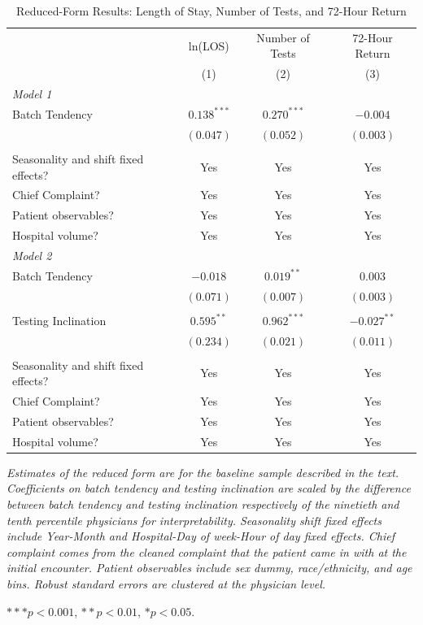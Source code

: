 \documentclass[,,nonblindrev]{informs}
\begin{document}
\begin{table}[htbp]
\centering
\caption{Reduced-Form Results: Length of Stay, Number of Tests, and 72-Hour Return}
\label{tab:reducedform}
\begin{tabular}{p{6.5cm}ccc}
\toprule
& \multicolumn{1}{c}{ln(LOS)}
& \multicolumn{1}{c}{Number of Tests}
& \multicolumn{1}{c}{72-Hour Return} \\
& \multicolumn{1}{c}{(1)}
& \multicolumn{1}{c}{(2)}
& \multicolumn{1}{c}{(3)} \\
\midrule
\textit{Model 1} & & & \\
Batch Tendency      & $0.138^{***}$ & $0.270^{***}$ & $-0.004$  \\
                    & $(0.047)$  & $(0.052)$     & $(0.003)$ \\
\\
Seasonality and shift fixed effects? & Yes & Yes & Yes \\
Chief Complaint? & Yes & Yes & Yes \\
Patient observables? & Yes & Yes & Yes \\
Hospital volume? & Yes & Yes & Yes \\
\midrule
\midrule
\textit{Model 2} & & & \\
Batch Tendency      & $-0.018$      & $0.019^{**}$ & $0.003$   \\
                    & $(0.071)$     & $(0.007)$     & $(0.003)$ \\
                    &     &     &  \\
Testing Inclination    & $0.595^{**}$  & $0.962^{***}$ & $-0.027^{**}$ \\
                    & $(0.234)$  & $(0.021)$     & $(0.011)$ \\
\\
Seasonality and shift fixed effects? & Yes & Yes & Yes \\
Chief Complaint? & Yes & Yes & Yes \\
Patient observables? & Yes & Yes & Yes \\
Hospital volume? & Yes & Yes & Yes \\
\bottomrule
\end{tabular}
\begin{tablenotes}
\tiny
\item \textit{Estimates of the reduced form are for the baseline sample described in the text. Coefficients on batch tendency and testing inclination are scaled by the difference between batch tendency and testing inclination respectively of the ninetieth and tenth percentile physicians for interpretability. Seasonality shift fixed effects include Year-Month and Hospital-Day of week-Hour of day fixed effects. Chief complaint comes from the cleaned complaint that the patient came in with at the initial encounter. Patient observables include sex dummy, race/ethnicity, and age bins. Robust standard errors are clustered at the physician level.}
\item $*** p < 0.001$, $** p < 0.01$, $* p < 0.05$.
\end{tablenotes}
\end{table}
\end{document}
